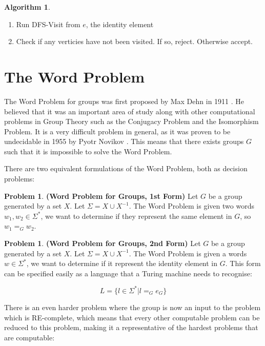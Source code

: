 \documentclass[10pt]{article}
\theoremstyle{plain}
\theoremstyle{definition}
\theoremstyle{definition}
\newtheorem{algorithm}[theorem]{Algorithm}
\theoremstyle{definition}
\newtheorem{problem}[theorem]{Problem}
\begin{document}
\begin{multicols}{2}
\begin{algorithm}
	\begin{enumerate}
		\setlength\itemsep{0em}
		\item Run DFS-Visit from $e$, the identity element
		\item Check if any verticies have not been visited. If so, reject. Otherwise accept.
	\end{enumerate}
\end{algorithm}


\section{The Word Problem}

The Word Problem for groups was first proposed by Max Dehn in 1911 \cite{Dehn}. He believed that it was an important area of study along with other computational problems in Group Theory such as the Conjugacy Problem and the Isomorphism Problem. It is a very difficult problem in general, as it was proven to be undecidable in 1955 by Pyotr Novikov \cite{Novikov}. This means that there exists groups $G$ such that it is impossible to solve the Word Problem.

There are two equivalent formulations of the Word Problem, both as decision problems:

\begin{problem}
	\textbf{(Word Problem for Groups, 1st Form)} Let $G$ be a group generated by a set $X$. Let $\Sigma = X \cup X^{-1}$. The Word Problem is given two words $w_1, w_2 \in \Sigma^*$, we want to determine if they represent the same element in $G$, so $w_1 =_G w_2$.
\end{problem}

\begin{problem}
	\textbf{(Word Problem for Groups, 2nd Form)} Let $G$ be a group generated by a set $X$. Let $\Sigma = X \cup X^{-1}$. The Word Problem is given a words $w \in \Sigma^*$, we want to determine if it represent the identity element in $G$. This form can be specified easily as a language that a Turing machine needs to recognise:

		$$ L = \{ l \in \Sigma^* | l =_G e_G \} $$
\end{problem}

There is an even harder problem where the group is now an input to the problem which is RE-complete, which means that every other computable problem can be reduced to this problem, making it a representative of the hardest problems that are computable:


\end{multicols}
\end{document}
